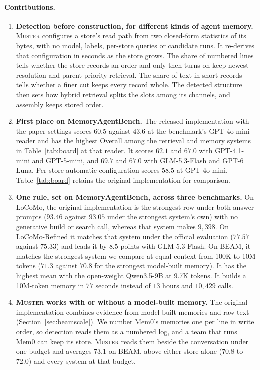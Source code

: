 \documentclass{article}
\newcommand{\sys}{\textsc{Muster}}
\begin{document}
\paragraph{Contributions.}
\begin{enumerate}[label=(\roman*),leftmargin=*,nosep]
\item \textbf{Detection before construction, for different kinds of agent memory.}
\sys{} configures a store's read path from two closed-form statistics of its bytes, with no model, labels, per-store queries or candidate runs. It re-derives that configuration in seconds as the store grows. The share of numbered lines tells whether the store records an order and only then turns on keep-newest resolution and parent-priority retrieval. The share of text in short records tells whether a finer cut keeps every record whole. The detected structure then sets how hybrid retrieval splits the slots among its channels, and assembly keeps stored order.
\item \textbf{First place on MemoryAgentBench.}
The released implementation with the paper settings scores $60.5$ against $43.6$ at the benchmark's GPT-4o-mini reader and has the highest Overall among the retrieval and memory systems in Table~\ref{tab:board} at that reader. It scores $62.1$ and $67.0$ with GPT-4.1-mini and GPT-5-mini, and $69.7$ and $67.0$ with GLM-5.3-Flash and GPT-6 Luna. Per-store automatic configuration scores $58.5$ at GPT-4o-mini. Table~\ref{tab:board} retains the original implementation for comparison.
\item \textbf{One rule, set on MemoryAgentBench, across three benchmarks.}
On LoCoMo, the original implementation is the strongest row under both answer prompts ($93.46$ against $93.05$ under the strongest system's own) with no generative build or search call, whereas that system makes $9{,}398$. On LoCoMo-Refined it matches that system under the official evaluation ($77.57$ against $75.33$) and leads it by $8.5$ points with GLM-5.3-Flash. On BEAM, it matches the strongest system we compare at equal context from 100K to 10M tokens ($71.3$ against $70.8$ for the strongest model-built memory). It has the highest mean with the open-weight Qwen3.5-9B at 9.7K tokens. It builds a 10M-token memory in $77$ seconds instead of $13$ hours and $10{,}429$ calls.
\item \textbf{\sys{} works with or without a model-built memory.}
The original implementation combines evidence from model-built memories and raw text (Section~\ref{sec:beamscale}). We number Mem0's memories one per line in write order, so detection reads them as a numbered log, and a team that runs Mem0 can keep its store. \sys{} reads them beside the conversation under one budget and averages $73.1$ on BEAM, above either store alone ($70.8$ to $72.0$) and every system at that budget.
\end{enumerate}
\end{document}

